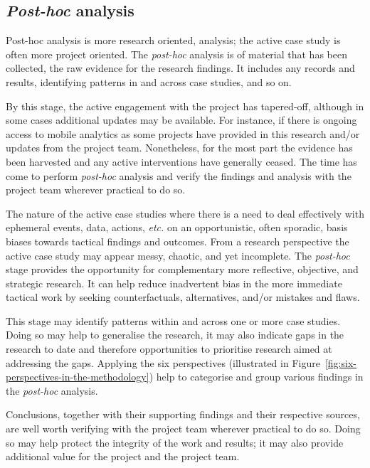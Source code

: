 \subsection{\emph{Post-hoc} analysis}
Post-hoc analysis is more research oriented, analysis; the active case study is often more project oriented. The \emph{post-hoc} analysis is of material that has been collected, the raw evidence for the research findings. It includes any records and results, identifying patterns in and across case studies, and so on.

By this stage, the active engagement with the project has tapered-off, although in some cases additional updates may be available. For instance, if there is ongoing access to mobile analytics as some projects have provided in this research and/or updates from the project team. Nonetheless, for the most part the evidence has been harvested and any active interventions have generally ceased. The time has come to perform \emph{post-hoc} analysis and verify the findings and analysis with the project team wherever practical to do so. 

The nature of the active case studies where there is a need to deal effectively with ephemeral events, data, actions, \textit{etc.} on an opportunistic, often sporadic, basis biases towards tactical findings and outcomes. From a research perspective the active case study may appear messy, chaotic, and yet incomplete. 
The \textit{post-hoc} stage provides the opportunity for complementary more reflective, objective, and strategic research. It can help reduce inadvertent bias in the more immediate tactical work by seeking counterfactuals, alternatives, and/or mistakes and flaws.


This stage may identify patterns within and across one or more case studies. Doing so may help to generalise the research, it may also indicate gaps in the research to date and therefore opportunities to prioritise research aimed at addressing the gaps. Applying the six perspectives (illustrated in Figure~\ref{fig:six-perspectives-in-the-methodology}) help to categorise and group various findings in the \textit{post-hoc} analysis. 

Conclusions, together with their supporting findings and their respective sources, are well worth verifying with the project team wherever practical to do so. Doing so may help protect the integrity of the work and results; it may also provide additional value for the project and the project team. 


